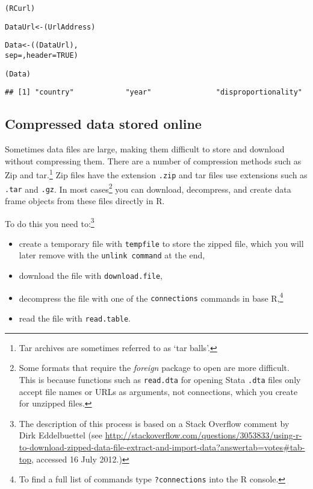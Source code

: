 {\small
\begin{knitrout}
\color{fgcolor}\begin{kframe}
\begin{alltt}
(RCurl)

DataUrl <- (UrlAddress)

Data <- ((DataUrl), 
					sep = , header = TRUE)
					
(Data)
\end{alltt}
\begin{verbatim}
## [1] "country"            "year"               "disproportionality"
\end{verbatim}
\end{kframe}
\end{knitrout}

}

\subsection{Compressed data stored online}

Sometimes data files are large, making them difficult to store and download without compressing them. There are a number of compression methods such as Zip and tar.\footnote{Tar archives are sometimes referred to as `tar balls'.} Zip files have the extension {\tt{.zip}} and tar files use extensions such as {\tt{.tar}} and {\tt{.gz}}. In most cases\footnote{Some formats that require the {\emph{foreign}} package to open are more difficult. This is because functions such as {\tt{read.dta}} for opening Stata {\tt{.dta}} files only accept file names or URLs as arguments, not connections, which you create for unzipped files.} you can download, decompress, and create data frame objects from these files directly in R. 

To do this you need to:\footnote{The description of this process is based on a Stack Overflow comment by Dirk Eddelbuettel (see {\url{http://stackoverflow.com/questions/3053833/using-r-to-download-zipped-data-file-extract-and-import-data?answertab=votes\#tab-top}}, accessed 16 July 2012.)}

\begin{itemize}
	\item create a temporary file with {\tt{tempfile}} to store the zipped file, which you will later remove with the {\tt{unlink command}} at the end,
	\item download the file with {\tt{download.file}},
	\item decompress the file with one of the {\tt{connections}} commands in base R,\footnote{To find a full list of commands type {\tt{?connections}} into the R console.}
	\item read the file with {\tt{read.table}}. 
\end{itemize}

